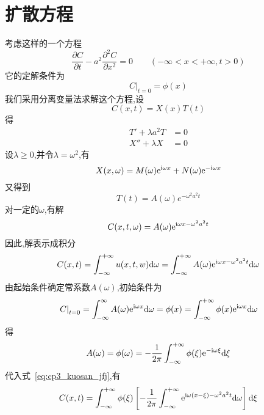 \section{扩散方程}
考虑这样的一个方程
\begin{equation}
 \dfrac{\partial C}{\partial t}-a^2\dfrac{\partial^2 C}{\partial x^2}=0\qquad(-\infty < x < +\infty,t>0)
\end{equation}
它的定解条件为
\begin{equation}
 \left.C\right|_{t=0}=\phi(x)
\end{equation}
我们采用分离变量法求解这个方程,设
\begin{equation}
 C(x,t)=X(x)T(t)
\end{equation}
得
\begin{align}
T'+\lambda a^2 T & =0\\
X'' + \lambda X &=0
\end{align}
设$\lambda\geq0$,并令$\lambda=\omega^2$,有
\begin{equation}
 X(x,\omega)=M(\omega)\mathrm{e}^{\mathrm{i}\omega x}+N(\omega)\mathrm{e}^{-\mathrm{i}\omega x}
\end{equation}
又得到
\begin{equation}
 T(t)=A(\omega)e^{-\omega^2 a^2 t}
\end{equation}
对一定的$\omega$,有解
\begin{equation}
 C(x,t,\omega)=A(\omega)\mathrm{e}^{\mathrm{i}\omega x-\omega^2 a^2 t}
\end{equation}
因此,解表示成积分
\begin{equation}\label{eq:cp3_kuosan_jfj}
 C(x,t)=\int_{-\infty}^{+\infty}u(x,t,w)\mathrm{d}\omega 
 = \int_{-\infty}^{+\infty}A(\omega)\mathrm{e}^{\mathrm{i}\omega x-\omega^2 a^2 t}\mathrm{d}\omega
\end{equation}
由起始条件确定常系数$A(\omega)$,初始条件为
\begin{equation}
 \left.C\right|_{t=0} = \int_{-\infty}^{\infty} A(\omega)\mathrm{e}^{\mathrm{i}\omega x}\mathrm{d}\omega
 =\phi(x)=\int_{-\infty}^{+\infty}\phi(x)\mathrm{e}^{\mathrm{i}\omega x}\mathrm{d}\omega
\end{equation}
得
\begin{equation}
 A(\omega)=\phi(\omega)=-\dfrac{1}{2\pi}\int_{-\infty}^{+\infty}\phi(\xi)
 \mathrm{e}^{-\mathrm{i}\omega\xi}\mathrm{d}\xi
\end{equation}
代入式~\eqref{eq:cp3_kuosan_jfj},有
\begin{equation}\label{eq:cp3_kuosan_jiex}
 C(x,t)=\int_{-\infty}^{+\infty}\phi(\xi)
 \left[-\dfrac{1}{2\pi}\int_{-\infty}^{+\infty}\mathrm{e}^{\mathrm{i}\omega(x-\xi)-\omega^2a^2t}\mathrm{d}\omega\right]\mathrm{d}\xi
\end{equation}\par
